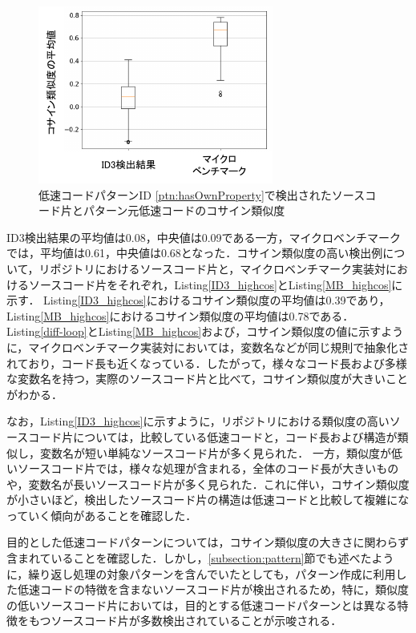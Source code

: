 \documentclass[submit,techrep,noauthor]{ipsj}
\begin{document}
\begin{figure}[t]
    \centering
    \includegraphics[width=0.85\linewidth]{./Noguchi_fig/boxplot_compare.pdf}
    \caption{低速コードパターンID \ref{ptn:hasOwnProperty}で検出されたソースコード片とパターン元低速コードのコサイン類似度}
    \label{fig:boxplot_cosine}
\end{figure}

ID3検出結果の平均値は0.08，中央値は0.09である一方，マイクロベンチマークでは，平均値は0.61，中央値は0.68となった．コサイン類似度の高い検出例について，リポジトリにおけるソースコード片と，マイクロベンチマーク実装対におけるソースコード片をそれぞれ，Listing\ref{ID3_highcos}とListing\ref{MB_highcos}に示す．
Listing\ref{ID3_highcos}におけるコサイン類似度の平均値は0.39であり，Listing\ref{MB_highcos}におけるコサイン類似度の平均値は0.78である．
Listing\ref{diff-loop}とListing\ref{MB_highcos}および，コサイン類似度の値に示すように，マイクロベンチマーク実装対においては，変数名などが同じ規則で抽象化されており，コード長も近くなっている．したがって，様々なコード長および多様な変数名を持つ，実際のソースコード片と比べて，コサイン類似度が大きいことがわかる．

なお，Listing\ref{ID3_highcos}に示すように，リポジトリにおける類似度の高いソースコード片については，比較している低速コードと，コード長および構造が類似し，変数名が短い単純なソースコード片が多く見られた．
一方，類似度が低いソースコード片では，様々な処理が含まれる，全体のコード長が大きいものや，変数名が長いソースコード片が多く見られた．これに伴い，コサイン類似度が小さいほど，検出したソースコード片の構造は低速コードと比較して複雑になっていく傾向があることを確認した．

目的とした低速コードパターンについては，コサイン類似度の大きさに関わらず含まれていることを確認した．しかし，\ref{subsection:pattern}節でも述べたように，繰り返し処理の対象パターンを含んでいたとしても，パターン作成に利用した低速コードの特徴を含まないソースコード片が検出されるため，特に，類似度の低いソースコード片においては，目的とする低速コードパターンとは異なる特徴をもつソースコード片が多数検出されていることが示唆される．
\end{document}

